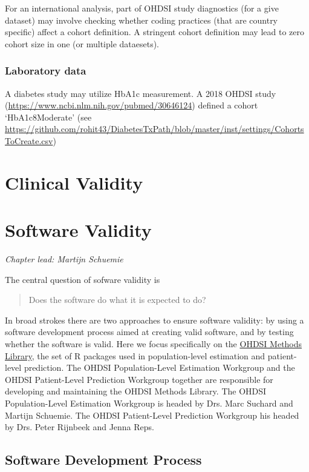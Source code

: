 \documentclass[]{book}
\begin{document}
For an international analysis, part of OHDSI study diagnostics (for a
give dataset) may involve checking whether coding practices (that are
country specific) affect a cohort definition. A stringent cohort
definition may lead to zero cohort size in one (or multiple dataesets).

\subsection{Laboratory data}\label{laboratory-data}

A diabetes study may utilize HbA1c measurement. A 2018 OHDSI study
(\url{https://www.ncbi.nlm.nih.gov/pubmed/30646124}) defined a cohort
`HbA1c8Moderate' (see
\url{https://github.com/rohit43/DiabetesTxPath/blob/master/inst/settings/CohortsToCreate.csv})

\chapter{Clinical Validity}\label{ClinicalValidity}

\chapter{Software Validity}\label{SoftwareValidity}

\emph{Chapter lead: Martijn Schuemie}

The central question of sofware validity is

\begin{quote}
Does the software do what it is expected to do?
\end{quote}

In broad strokes there are two approaches to ensure software validity:
by using a software development process aimed at creating valid
software, and by testing whether the software is valid. Here we focus
specifically on the \href{https://ohdsi.github.io/MethodsLibrary/}{OHDSI
Methods Library}, the set of R packages used in population-level
estimation and patient-level prediction. The OHDSI Population-Level
Estimation Workgroup and the OHDSI Patient-Level Prediction Workgroup
together are responsible for developing and maintaining the OHDSI
Methods Library. The OHDSI Population-Level Estimation Workgroup is
headed by Drs. Marc Suchard and Martijn Schuemie. The OHDSI
Patient-Level Prediction Workgroup his headed by Drs. Peter Rijnbeek and
Jenna Reps.

\section{Software Development
Process}\label{software-development-process}
\end{document}
